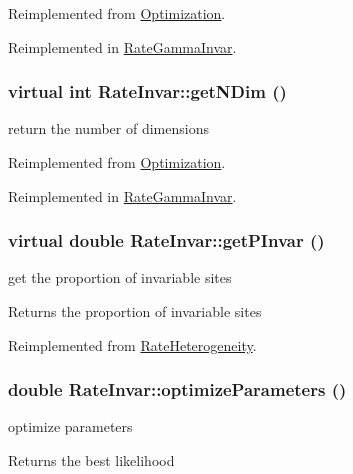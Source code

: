 Reimplemented from \hyperlink{classOptimization_ad7ca7b884076f8c76312d516e23c6609}{Optimization}.

Reimplemented in \hyperlink{classRateGammaInvar_a48fde92a023867c5d0656572f8dc0f71}{RateGammaInvar}.\hypertarget{classRateInvar_a3ffa388d5aa7f56bb2c047c35bc3b453}{
\subsubsection[{getNDim}]{\setlength{\rightskip}{0pt plus 5cm}virtual int RateInvar::getNDim ()}}
\label{classRateInvar_a3ffa388d5aa7f56bb2c047c35bc3b453}
return the number of dimensions 

Reimplemented from \hyperlink{classOptimization_a6d04cefb0969f3cac9b607aa1412eb57}{Optimization}.

Reimplemented in \hyperlink{classRateGammaInvar_a4f276d1639a79eece217b365439049c7}{RateGammaInvar}.\hypertarget{classRateInvar_a750aa513c32453d28cc50b14bb31a9a7}{
\subsubsection[{getPInvar}]{\setlength{\rightskip}{0pt plus 5cm}virtual double RateInvar::getPInvar ()}}
\label{classRateInvar_a750aa513c32453d28cc50b14bb31a9a7}
get the proportion of invariable sites \begin{DoxyReturn}{Returns}
the proportion of invariable sites 
\end{DoxyReturn}


Reimplemented from \hyperlink{classRateHeterogeneity_ada76d84ed7f66ddde02734d9c72f4e7b}{RateHeterogeneity}.\hypertarget{classRateInvar_a593bcac4c771b4b69c2f286ed8789793}{
\subsubsection[{optimizeParameters}]{\setlength{\rightskip}{0pt plus 5cm}double RateInvar::optimizeParameters ()}}
\label{classRateInvar_a593bcac4c771b4b69c2f286ed8789793}
optimize parameters \begin{DoxyReturn}{Returns}
the best likelihood 
\end{DoxyReturn}



